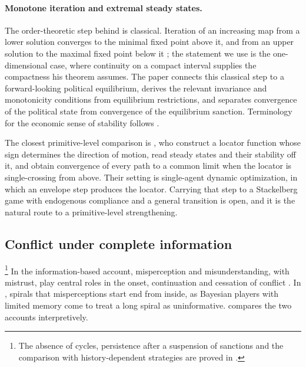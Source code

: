 \paragraph{Monotone iteration and extremal steady states.}
The order-theoretic step behind  is classical.
Iteration of an increasing map from a lower solution converges to the minimal
fixed point above it, and from an upper solution to the maximal fixed point below
it \citep[Theorem 6.1 and Corollary 6.2]{Amann1976}; the statement we use is the
one-dimensional case, where continuity on a compact interval supplies the
compactness his theorem assumes. The paper connects this classical step to a
forward-looking political equilibrium, derives the relevant invariance and
monotonicity conditions from equilibrium restrictions, and separates convergence
of the political state from convergence of the equilibrium sanction. Terminology
for the economic sense of stability follows \citet{StokeyLucas1989}.

The closest primitive-level comparison is \citet{HuangPouzoRodriguezClare2025},
who construct a locator function whose sign determines the direction of motion,
read steady states and their stability off it, and obtain convergence of every
path to a common limit when the locator is single-crossing from above. Their
setting is single-agent dynamic optimization, in which an envelope step produces
the locator. Carrying that step to a Stackelberg game with endogenous compliance
and a general transition is open, and it is the natural route to a
primitive-level strengthening.

\subsection{Conflict under complete information}
\label{sec:discussion:misperception}

\footnote{The absence of cycles, persistence after a suspension of sanctions and
the comparison with history-dependent strategies are proved in
.} In the information-based account, misperception and misunderstanding,
with mistrust, play central roles in the onset, continuation and cessation of
conflict \citep{AcemogluWolitzkyMistrust}. In \citet{AcemogluWolitzky2014},
spirals that misperceptions start end from inside, as Bayesian players with
limited memory come to treat a long spiral as uninformative.
 compares the two accounts interpretively.

